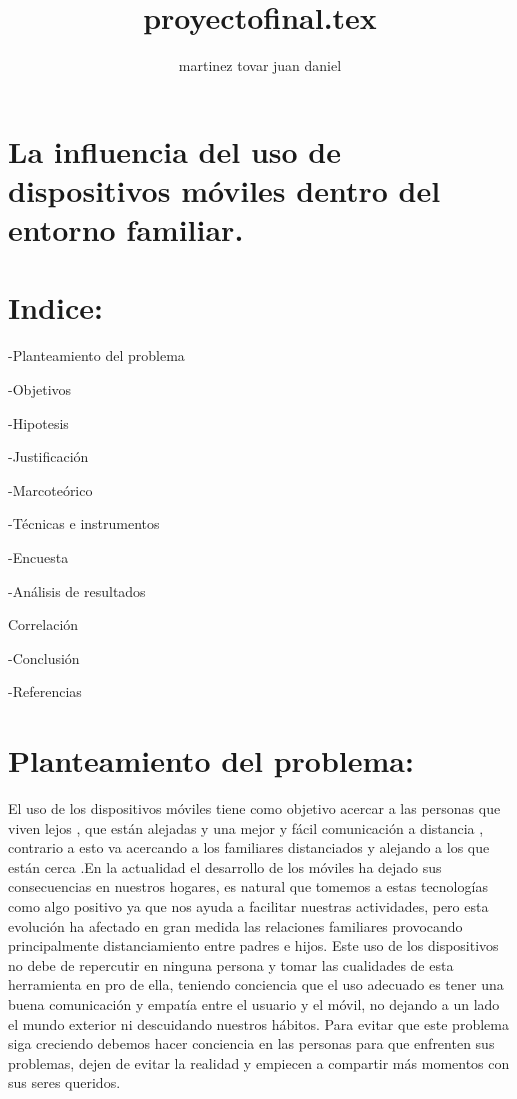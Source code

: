 \documentclass[10pt,a4paper]{article}
\author{martinez tovar juan daniel}
\title{proyectofinal.tex}
\begin{document}
	
\section{La influencia del uso de dispositivos m{\'o}viles dentro del entorno familiar.}


\section{Indice:}
	
	
-Planteamiento del problema 	

-Objetivos 	

-Hipotesis 	

-Justificaci{\'o}n 	

-Marcote{\'o}rico 	

-T{\'e}cnicas e instrumentos	

-Encuesta 	

-An{\'a}lisis de resultados 	

Correlaci{\'o}n	

-Conclusi{\'o}n 	

-Referencias 	


		
		\section{Planteamiento del problema:}
		
		
El uso de los dispositivos m{\'o}viles tiene como objetivo acercar a las personas que viven lejos , que est{\'a}n alejadas y una mejor y f{\'a}cil comunicaci{\'o}n a distancia , contrario a esto va acercando a los familiares distanciados y alejando a los que est{\'a}n cerca .En la actualidad el desarrollo de los m{\'o}viles ha dejado sus consecuencias en nuestros hogares, es natural que tomemos a estas tecnolog{\'i}as como algo positivo ya que nos ayuda a facilitar nuestras actividades, pero esta evoluci{\'o}n ha afectado en gran medida las relaciones familiares provocando principalmente distanciamiento entre padres e hijos. Este uso de los dispositivos no debe de repercutir en ninguna persona y tomar las cualidades de esta herramienta en pro de ella, teniendo conciencia que el uso adecuado  es tener una buena comunicaci{\'o}n y empat{\'i}a entre el usuario y el m{\'o}vil, no dejando a un lado el mundo exterior ni descuidando nuestros h{\'a}bitos. Para evitar que este problema siga creciendo debemos hacer conciencia en las personas para que enfrenten sus problemas, dejen de evitar la realidad y empiecen a compartir m{\'a}s momentos con sus seres queridos.
\end{document}
